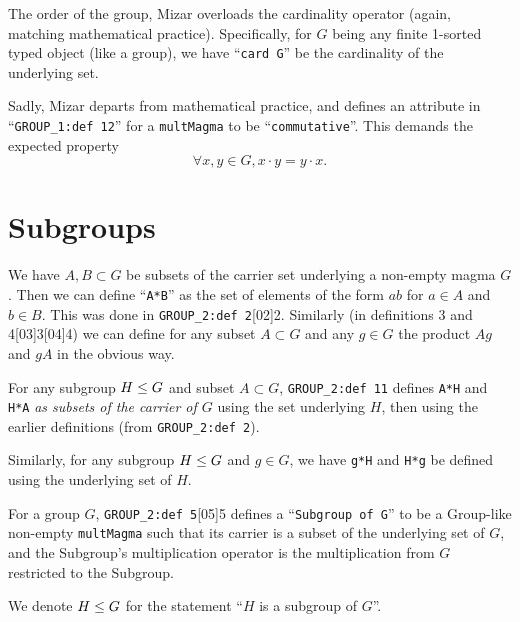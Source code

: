 The order of the group, Mizar overloads the cardinality operator (again,
matching mathematical practice). Specifically, 
for $G$ being any finite 1-sorted typed object (like a group), we have
``\verb#card G#'' be the cardinality
of the underlying set.

Sadly, Mizar departs from mathematical practice, and defines an
attribute in ``\verb#GROUP_1:def 12#'' for a \verb#multMagma# to be
``\verb#commutative#''.
This demands the expected property
\begin{equation*}
  \forall x,y\in G, x\cdot y=y\cdot x.
\end{equation*}

\section{Subgroups}

We have $A,B\subset G$ be subsets of the carrier set underlying a
non-empty magma $G$. Then we can define ``\verb#A*B#'' as the set of
elements of the form $ab$ for $a\in A$ and $b\in B$. This was done in
\verb#GROUP_2:def 2#[02]{2}. Similarly (in definitions
3 and 4[03]{3}[04]{4}) we can define
for any subset $A\subset G$ and any $g\in G$ the product $Ag$ and $gA$
in the obvious way.

For any subgroup $H\leq G$ and subset $A\subset G$,
\verb#GROUP_2:def 11# defines \verb$A*H$ and
\verb$H*A$ \emph{as subsets of the carrier of $G$} using the set
underlying $H$, then using the earlier definitions (from
\verb#GROUP_2:def 2#).

Similarly, for any subgroup $H\leq G$ and $g\in G$, we have
\verb#g*H# and \verb#H*g# be defined using the underlying set of $H$.

For a group $G$, \verb#GROUP_2:def 5#[05]{5} defines a
``\verb#Subgroup of G#'' to be a Group-like non-empty \verb#multMagma#
such that its carrier is a subset of the underlying set of $G$, and the
Subgroup's multiplication operator is the multiplication from $G$
restricted to the Subgroup.

\begin{remark}[Notation]
We denote $H\leq G$ for the statement ``$H$ is a subgroup of $G$''.
\end{remark}

